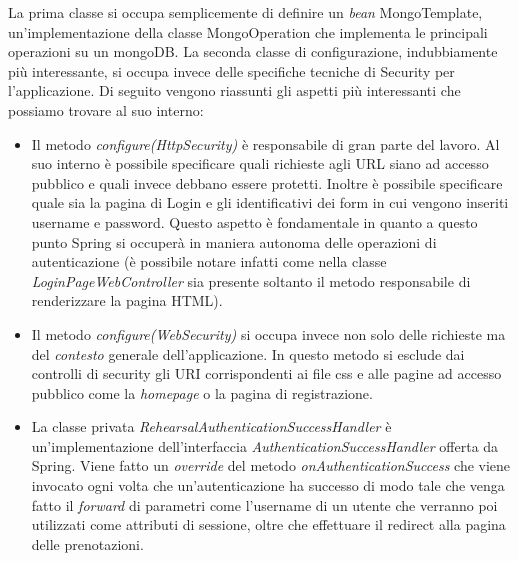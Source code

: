 La prima classe si occupa semplicemente di definire un \textsl{bean} MongoTemplate, un'implementazione della classe MongoOperation che implementa le principali operazioni su un mongoDB.\newline
La seconda classe di configurazione, indubbiamente più interessante, si occupa invece delle specifiche tecniche di Security per l'applicazione. Di seguito vengono riassunti gli aspetti più interessanti che possiamo trovare al suo interno:
\begin{itemize}
	\item Il metodo \textsl{configure(HttpSecurity)} è responsabile di gran parte del lavoro. Al suo interno è possibile specificare quali richieste agli URL siano ad accesso pubblico e quali invece debbano essere protetti. Inoltre è possibile specificare quale sia la pagina di Login e gli identificativi dei form in cui vengono inseriti username e password. Questo aspetto è fondamentale in quanto a questo punto Spring si occuperà in maniera autonoma delle operazioni di autenticazione (è possibile notare infatti come nella classe \textsl{LoginPageWebController} sia presente soltanto il metodo responsabile di renderizzare la pagina HTML).
	\item Il metodo \textsl{configure(WebSecurity)} si occupa invece non solo delle richieste ma del \textsl{contesto} generale dell'applicazione. In questo metodo si esclude dai controlli di security gli URI corrispondenti ai file css e alle pagine ad accesso pubblico come la \textsl{homepage} o la pagina di registrazione.
	\item La classe privata \textsl{RehearsalAuthenticationSuccessHandler} è un'implementazione dell'interfaccia \textsl{AuthenticationSuccessHandler} offerta da Spring. Viene fatto un \textsl{override} del metodo \textsl{onAuthenticationSuccess} che viene invocato ogni volta che un'autenticazione ha successo di modo tale che venga fatto il \textsl{forward} di parametri come l'username di un utente che verranno poi utilizzati come attributi di sessione, oltre che effettuare il redirect alla pagina delle prenotazioni.
\end{itemize}


